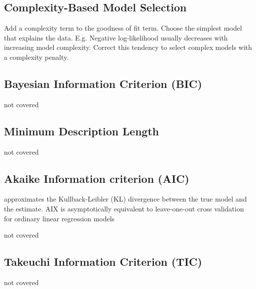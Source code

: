 \subsection{Complexity-Based Model Selection}
Add a complexity term to the goodness of fit term. 
Choose the simplest model that explains the data.
E.g. Negative log-likelihood usually decreases with increasing model complexity. Correct this tendency to select complex models with a complexity penalty.

\subsection{Bayesian Information Criterion (BIC)}
not covered
\subsection{Minimum Description Length}
not covered
\subsection{Akaike Information criterion (AIC)}
approximates the Kullback-Leibler (KL) divergence between the true model and the estimate. AIX is asymptotically equivalent to leave-one-out cross validation for ordinary linear regression models

not covered

\subsection{Takeuchi Information Criterion (TIC)}
not covered
